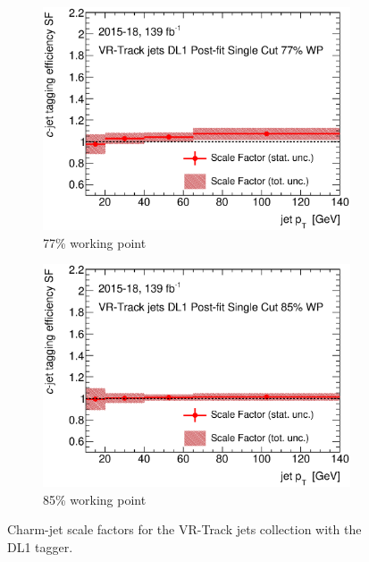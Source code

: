 \begin{figure}[H]
\begin{subfigure}[t]{.35\linewidth}
		\includegraphics[width=1\textwidth]{FTAG_plots/DL1allVRJetsDec/SF77.eps}
		\caption{77\% working point}
		\end{subfigure}
		\begin{subfigure}[t]{.35\linewidth}
		\includegraphics[width=1\textwidth]{FTAG_plots/DL1allVRJetsDec/SF85.eps}
		\caption{85\% working point}
		\end{subfigure}
	\caption{Charm-jet scale factors for the VR-Track jets collection with 
	the DL1 tagger.} \label{fig:Dec_SF_VRJets_DL1}
	\end{figure}
	

